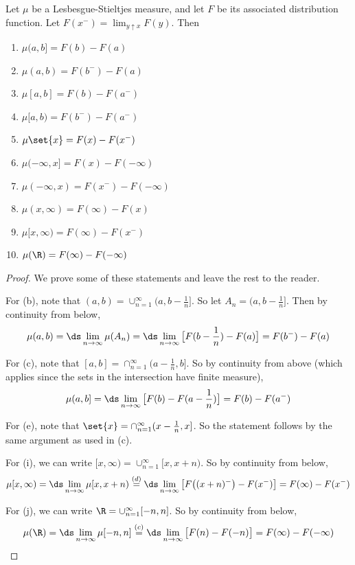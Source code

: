 \documentclass{article} %
\newenvironment{alphabate}
    {\begin{enumerate}[label=\alph*)]}
	{\end{enumerate} }
\begin{document}
 \begin{proposition}
 Let $\mu$ be a Lesbesgue-Stieltjes measure, and let $F$ be its associated distribution function.    Let $F(x^-) = \lim_{y \uparrow x} F(y)$. Then 

 \begin{alphabate}
 \item $\mu(a,b] = F(b) - F(a)$	
 \item $\mu(a,b) = F(b^-) - F(a)$	
 \item $\mu[a,b] = F(b) - F(a^-)$	
 \item $\mu[a,b) = F(b^-) - F(a^-)$	
 \item $\mu\set{x} = F(x) - F(x^-)$	
 \item $\mu(-\infty,x] = F(x) - F(-\infty)$	
 \item $\mu(-\infty,x) = F(x^-) - F(-\infty)$	
 \item $\mu(x,\infty) = F(\infty) - F(x)$	
 \item $\mu[x,\infty) = F(\infty) - F(x^-)$	
 \item $\mu(\R) = F(\infty) - F(-\infty)$	
 \end{alphabate}
 \label{prop:properties_of_LS_measures}
\end{proposition}

\begin{proof}
We prove some of these statements and leave the rest to the reader.  

For (b), note that $(a,b) = \cup_{n=1}^\infty (a, b-\frac{1}{n}]$.  So let $A_n = (a, b-\frac{1}{n}]$. Then  by continuity from below,
\[\mu(a,b) = \ds\lim_{n \to \infty}  \mu(A_n) = \ds\lim_{n \to \infty} \big[F(b-\frac{1}{n}) - F(a) \big] = F(b^-) - F (a) \]

For (c), note that $[a,b] = \cap_{n=1}^\infty (a-\frac{1}{n}, b]$.   So by continuity from above (which applies since the sets in the intersection have finite measure),
\[\mu(a,b] = \ds\lim_{n \to \infty} \big[F(b) - F(a - \frac{1}{n}) \big] = F(b) - F (a^-) \]

For (e), note that $\set{x} = \cap_{n=1}^\infty (x-\frac{1}{n}, x]$.   So the statement follows by the same argument as used in (c).

For (i), we can write $[x,\infty) = \cup_{n=1}^\infty [x, x+n)$.  So by continuity from below, 
\[\mu[x,\infty) = \ds\lim_{n \to \infty}  \mu[x, x+n) \stackrel{(d)}{=} \ds\lim_{n \to \infty} \big[ F\big( (x+n)^- \big) - F(x^-) \big] = F(\infty) - F(x^-) \]

For (j), we can write $\R = \cup_{n=1}^\infty [-n, n]$.  So by continuity from below, 
\[\mu(\R) = \ds\lim_{n \to \infty}  \mu[-n,n] \stackrel{(c)}{=} \ds\lim_{n \to \infty} \big[ F(n) - F(-n) \big] = F(\infty) - F(-\infty) \]
\end{proof}
\end{document}
